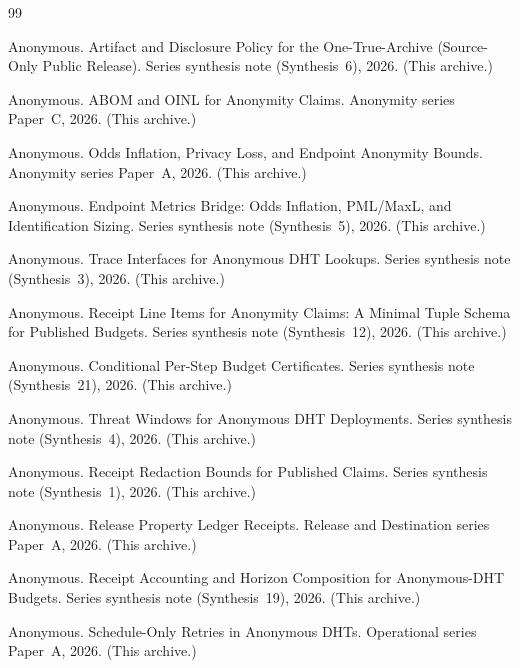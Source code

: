 \documentclass[11pt]{article}
\begin{document}
\begin{thebibliography}{99}\small

Anonymous.
\newblock Artifact and Disclosure Policy for the One-True-Archive (Source-Only Public Release).
\newblock Series synthesis note (Synthesis~6), 2026. (This archive.)

Anonymous.
\newblock ABOM and OINL for Anonymity Claims.
\newblock Anonymity series Paper~C, 2026. (This archive.)

Anonymous.
\newblock Odds Inflation, Privacy Loss, and Endpoint Anonymity Bounds.
\newblock Anonymity series Paper~A, 2026. (This archive.)

Anonymous.
\newblock Endpoint Metrics Bridge: Odds Inflation, PML/MaxL, and Identification Sizing.
\newblock Series synthesis note (Synthesis~5), 2026. (This archive.)

Anonymous.
\newblock Trace Interfaces for Anonymous DHT Lookups.
\newblock Series synthesis note (Synthesis~3), 2026. (This archive.)

Anonymous.
\newblock Receipt Line Items for Anonymity Claims: A Minimal Tuple Schema for Published Budgets.
\newblock Series synthesis note (Synthesis~12), 2026. (This archive.)

Anonymous.
\newblock Conditional Per-Step Budget Certificates.
\newblock Series synthesis note (Synthesis~21), 2026. (This archive.)


Anonymous.
\newblock Threat Windows for Anonymous DHT Deployments.
\newblock Series synthesis note (Synthesis~4), 2026. (This archive.)

Anonymous.
\newblock Receipt Redaction Bounds for Published Claims.
\newblock Series synthesis note (Synthesis~1), 2026. (This archive.)

Anonymous.
\newblock Release Property Ledger Receipts.
\newblock Release and Destination series Paper~A, 2026. (This archive.)

Anonymous.
\newblock Receipt Accounting and Horizon Composition for Anonymous-DHT Budgets.
\newblock Series synthesis note (Synthesis~19), 2026. (This archive.)

Anonymous.
\newblock Schedule-Only Retries in Anonymous DHTs.
\newblock Operational series Paper~A, 2026. (This archive.)


\end{thebibliography}
\end{document}
